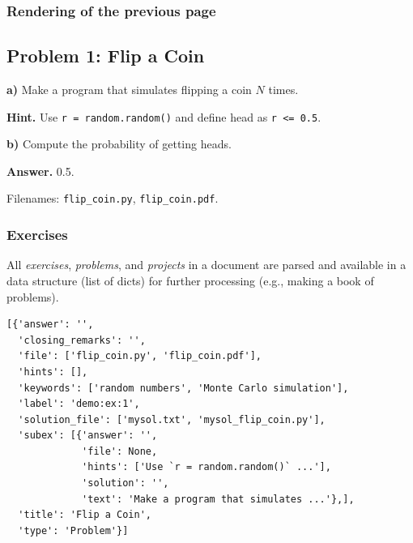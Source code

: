 \documentclass{beamer}
\newenvironment{doconce:exercise}{}{}
\newcounter{doconce:exercise:counter}
\newcounter{doconce:movie:counter}
\begin{document}
\begin{frame}
\frametitle{Rendering of the previous page}

\begin{doconce:exercise}

\subsection*{Problem 1: Flip a Coin}


\noindent\textbf{a)}
Make a program that simulates flipping a coin $N$ times.


\noindent\textbf{Hint.}
Use \Verb!r = random.random()! and define head as \Verb!r <= 0.5!.


\noindent\textbf{b)}
Compute the probability of getting heads.


\noindent\textbf{Answer.}
0.5.


Filenames: \Verb!flip_coin.py!, \Verb!flip_coin.pdf!.

\end{doconce:exercise}
\end{frame}

\begin{frame}
\frametitle{Exercises}

All \emph{exercises}, \emph{problems}, and \emph{projects} in a document are parsed
and available in a data structure (list of dicts) for further
processing (e.g., making a book of problems).

\begin{Verbatim}[numbers=none,fontsize=\fontsize{9pt}{9pt},baselinestretch=0.95]
[{'answer': '',
  'closing_remarks': '',
  'file': ['flip_coin.py', 'flip_coin.pdf'],
  'hints': [],
  'keywords': ['random numbers', 'Monte Carlo simulation'],
  'label': 'demo:ex:1',
  'solution_file': ['mysol.txt', 'mysol_flip_coin.py'],
  'subex': [{'answer': '',
             'file': None,
             'hints': ['Use `r = random.random()` ...'],
             'solution': '',
             'text': 'Make a program that simulates ...'},],
  'title': 'Flip a Coin',
  'type': 'Problem'}]
\end{Verbatim}
\end{frame}
\end{document}
